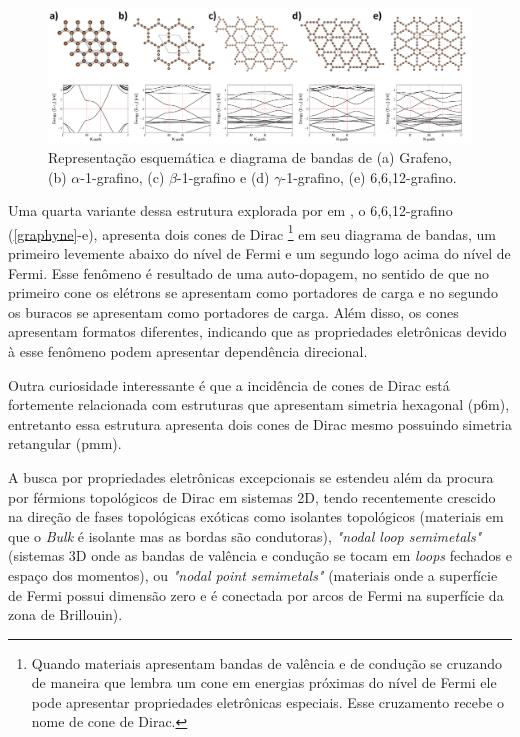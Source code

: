 		\begin{figure}[!h]
			\centering
			\includegraphics[width=1\linewidth]{capitulos/fig/intro/graphyne}
			\caption{Representação esquemática e diagrama de bandas de (a) Grafeno, (b) $\alpha$-1-grafino, (c) $\beta$-1-grafino e (d) $\gamma$-1-grafino, (e) 6,6,12-grafino.}
			\label{graphyne}
		\end{figure}
	
		Uma quarta variante dessa estrutura explorada por \citeauthor{malko2012competition} em \citeyear{malko2012competition}, o 6,6,12-grafino (\autoref{graphyne}-e), apresenta dois cones de Dirac \footnote{Quando materiais apresentam bandas de valência e de condução se cruzando de maneira que lembra um cone em energias próximas do nível de Fermi ele pode apresentar propriedades eletrônicas especiais. Esse cruzamento recebe o nome de cone de Dirac.} em seu diagrama de bandas, um primeiro levemente abaixo do nível de Fermi e um segundo logo acima do nível de Fermi.\cite{malko2012competition} Esse fenômeno é resultado de uma auto-dopagem, no sentido de que no primeiro cone os elétrons se apresentam como portadores de carga e no segundo os buracos se apresentam como portadores de carga. Além disso, os cones apresentam formatos diferentes, indicando que as propriedades eletrônicas devido à esse fenômeno podem apresentar dependência direcional. 
		
		Outra curiosidade interessante é que a incidência de cones de Dirac está fortemente relacionada com estruturas que apresentam simetria hexagonal (p6m)\cite{wehling2014dirac}, entretanto essa estrutura apresenta dois cones de Dirac mesmo possuindo simetria retangular (pmm).
		
		A busca por propriedades eletrônicas excepcionais se estendeu além da procura por férmions topológicos de Dirac em sistemas 2D, tendo recentemente crescido na direção de fases topológicas exóticas como isolantes topológicos (materiais em que o \textit{Bulk} é isolante mas as bordas são condutoras), \textit{"nodal loop semimetals"} (sistemas 3D onde as bandas de valência e condução se tocam em \textit{loops} fechados e espaço dos momentos), ou \textit{"nodal point semimetals"} (materiais onde a superfície de Fermi possui dimensão zero e é conectada por arcos de Fermi na superfície da zona de Brillouin).  
		

